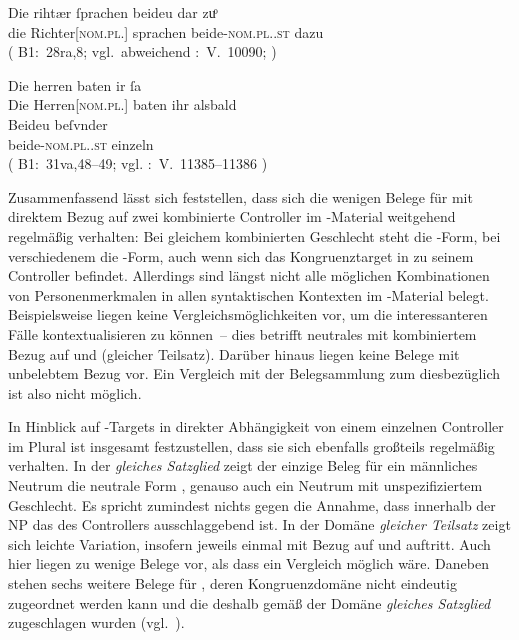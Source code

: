 \begin{exe}
\ex \label{ex:richtherriu2}
	\begin{xlist}
	\ex \label{ex:richtherriu2_1}
		\gll Die rihtær ſprachen beideu {dar zuͦ} \\
			die Richter[\textsc{nom.pl.\MascM}] sprachen beide-\textsc{nom.pl.\NeutM.st}
			dazu \\
		\trans {}
			(%
				B1:~28ra,8; vgl.~abweichend
				\KC:~V.~10090;
				\cite[267]{schroeder1895}%
			)

	\ex \label{ex:richtherriu2_2}
		\gll Die herren baten ir ſa \\
			Die Herren[\textsc{nom.pl.\MascM}] baten ihr alsbald \\
	\sn \gll Beideu beſvnder \\
			beide-\textsc{nom.pl.\NeutM.st} einzeln \\
		\trans {}
			(%
				B1:~31va,48--49; vgl.
				\KC:~V.~11385--11386
				\cite[289]{schroeder1895}%
			)
	\end{xlist}
\end{exe}

Zusammenfassend lässt sich feststellen, dass sich die wenigen Belege für
 mit direktem Bezug auf zwei kombinierte Controller im
\KC{}-Material weitgehend regelmäßig verhalten: Bei gleichem
kombinierten Geschlecht steht die -Form, bei verschiedenem die
-Form, auch wenn sich das Kongruenztarget in  zu
seinem Controller befindet. Allerdings sind längst nicht alle möglichen
Kombinationen von Personenmerkmalen in allen syntaktischen Kontexten im
\KC{}-Material belegt. Beispielsweise liegen keine
Vergleichs\-möglich\-keiten vor, um die interessanteren Fälle kontextualisieren
zu können~-- dies betrifft neutrales  mit kombiniertem Bezug auf
  und  (gleicher Teilsatz). Darüber hinaus
liegen keine Belege mit unbelebtem Bezug vor. Ein Vergleich mit der
Belegsammlung zum \CAO{} diesbezüglich ist also nicht möglich.

In Hinblick auf -Targets in direkter Abhängigkeit von einem
einzelnen Controller im Plural ist insgesamt festzustellen, dass sie sich
ebenfalls großteils regelmäßig verhalten. In der  \emph{gleiches
Satzglied} zeigt der einzige Beleg für ein männliches Neutrum die neutrale Form
, genauso auch ein Neutrum mit unspezifiziertem Geschlecht. Es
spricht zumindest nichts gegen die Annahme, dass innerhalb der
NP das  des Controllers ausschlaggebend ist. In
der Domäne \emph{gleicher Teilsatz} zeigt sich leichte Variation, insofern
jeweils einmal  mit Bezug auf   und
  auftritt. Auch hier liegen zu wenige Belege vor,
als dass ein Vergleich möglich wäre. Daneben stehen sechs weitere Belege für
, deren Kongruenzdomäne nicht eindeutig zugeordnet
werden kann und die deshalb gemäß \citet[623]{ksw2} der Domäne \emph{gleiches
Satzglied} zugeschlagen wurden (vgl.~).

